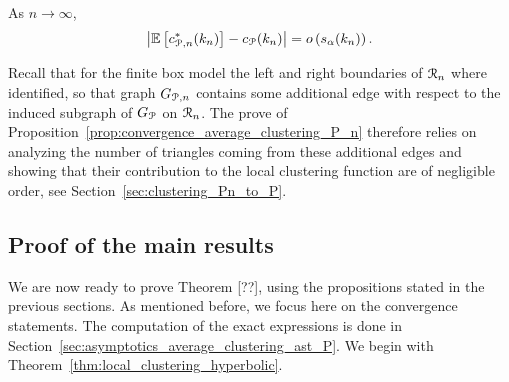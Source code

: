 \begin{proposition}\label{prop:convergence_average_clustering_P_n}
As $n \to \infty$,
\[
	\left|\mathbb{E}\left[c_{{\mathcal P},n}^\ast(k_n)\right] - c_{{\mathcal P}}(k_n)\right| = o\left(s_\alpha(k_n)\right).
\]
\end{proposition}


Recall that for the finite box model the left and right boundaries of ${\mathcal R}_n$ where identified, so that graph $G_{{\mathcal P},n}$ contains some additional edge with respect to the induced subgraph of $G_{{\mathcal P}}$ on ${\mathcal R}_n$. The prove of Proposition~\ref{prop:convergence_average_clustering_P_n} therefore relies on analyzing the number of triangles coming from these additional edges and showing that their contribution to the local clustering function are of negligible order, see Section~\ref{sec:clustering_Pn_to_P}. 

\subsection{Proof of the main results}\label{ssec:proof_main_result_diverging_k}

We are now ready to prove Theorem [??], using the propositions stated in the previous sections. As mentioned before, we focus here on the convergence statements. The computation of the exact expressions is done in Section~\ref{sec:asymptotics_average_clustering_ast_P}. We begin with Theorem~\ref{thm:local_clustering_hyperbolic}.

